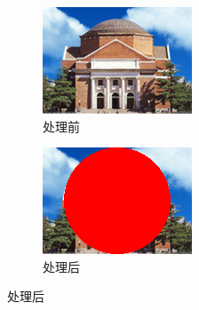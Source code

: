 \documentclass{article}
\numberwithin{figure}{section}
\numberwithin{table}{section}
\numberwithin{listing}{section}
\begin{document}
\begin{enumerate}
\begin{enumerate}
                        \begin{figure}[H]
                            \centering
                                \begin{subfigure}{0.3\textwidth}
                                    \includegraphics[width=\linewidth]{hall_color}
                                    \caption{处理前}
                                    \label{fig:hall_color}
                                \end{subfigure}

                                \begin{subfigure}{0.3\textwidth}
                                    \includegraphics[width=\linewidth]{hall_color_red_circle}
                                    \caption{处理后}
                                    \label{fig:hall_color_red_circle}
                                \end{subfigure}


\end{figure}
\end{enumerate}
\end{enumerate}
\end{document}

